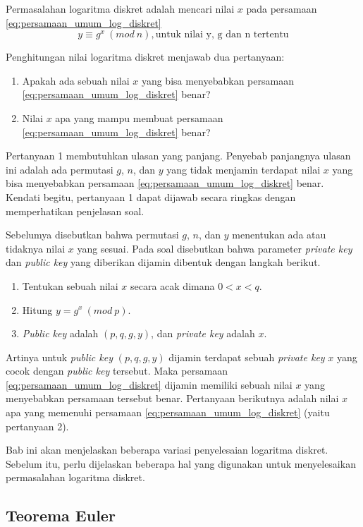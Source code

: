 Permasalahan logaritma diskret adalah mencari nilai $ x $ pada persamaan \eqref{eq:persamaan_umum_log_diskret}
\[
y \equiv g^{x}\ (mod\ n),\text{untuk nilai y, g dan n tertentu}
\]

Penghitungan nilai logaritma diskret menjawab dua pertanyaan:
\begin{enumerate}
\item Apakah ada sebuah nilai $ x $ yang bisa menyebabkan persamaan \eqref{eq:persamaan_umum_log_diskret} benar?
\item Nilai $ x $ apa yang mampu membuat persamaan \eqref{eq:persamaan_umum_log_diskret} benar?
\end{enumerate}

Pertanyaan 1 membutuhkan ulasan yang panjang. Penyebab panjangnya ulasan ini adalah ada permutasi $ g $, $ n $, dan $ y $ yang tidak menjamin terdapat nilai $ x $ yang bisa menyebabkan persamaan \eqref{eq:persamaan_umum_log_diskret} benar. Kendati begitu, pertanyaan 1 dapat dijawab secara ringkas dengan memperhatikan penjelasan soal. 

Sebelumya disebutkan bahwa permutasi $ g $, $ n $, dan $ y $ menentukan ada atau tidaknya nilai $ x $ yang sesuai. Pada soal disebutkan bahwa parameter \textit{private key} dan \textit{public key} yang diberikan dijamin dibentuk dengan langkah berikut.

\begin{enumerate}
\item Tentukan sebuah nilai $ x $ secara acak dimana $ 0 < x < q $.
\item Hitung $ y = g^x\ (mod\ p) $.
\item \textit{Public key} adalah $ (p, q, g, y) $, dan \textit{private key} adalah $ x $.
\end{enumerate}

Artinya untuk \textit{public key} $ (p, q, g, y) $ dijamin terdapat sebuah \textit{private key} $ x $ yang cocok dengan \textit{public key} tersebut. Maka persamaan \eqref{eq:persamaan_umum_log_diskret} dijamin memiliki sebuah nilai $ x $ yang menyebabkan persamaan tersebut benar. Pertanyaan berikutnya adalah nilai $ x $ apa yang memenuhi persamaan \eqref{eq:persamaan_umum_log_diskret} (yaitu pertanyaan 2).

Bab ini akan menjelaskan beberapa variasi penyelesaian logaritma diskret. Sebelum itu, perlu dijelaskan beberapa hal yang digunakan untuk menyelesaikan permasalahan logaritma diskret.

\subsection {Teorema Euler}

